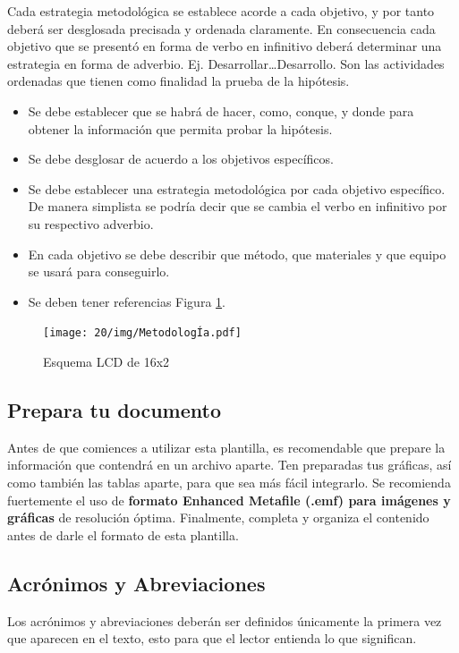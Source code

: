 Cada estrategia metodológica se establece acorde a cada objetivo, y por tanto deberá ser desglosada precisada y ordenada claramente. En consecuencia cada objetivo que se presentó en forma de verbo en infinitivo deberá determinar una estrategia en forma de adverbio. Ej. Desarrollar…Desarrollo. Son las actividades ordenadas que tienen como finalidad la prueba de la hipótesis. 

\begin{itemize}
    \item Se debe establecer que se habrá de hacer, como, conque, y donde para obtener la información que permita probar la hipótesis.  
    \item Se debe desglosar de acuerdo a los objetivos específicos. 
    \item Se debe establecer una estrategia metodológica por cada objetivo específico. De manera simplista se podría decir que se cambia el verbo en infinitivo por su respectivo adverbio.
    \item En cada objetivo se debe describir que método, que materiales y que equipo se usará para conseguirlo.
    \item Se deben tener referencias Figura \ref{fig:lcd-16x2}.
\end{itemize}
%
% 
\begin{figure}[H]
    \centering
    \texttt{[image: 20/img/MetodologÍa.pdf]}
    \caption{Esquema LCD de 16x2}
    \label{fig:lcd-16x2}
\end{figure}
% 
% 
\subsection{Prepara tu documento}

Antes de que comiences a utilizar esta plantilla, es recomendable que prepare la información que contendrá en un archivo aparte. 
Ten preparadas tus gráficas, así como también las tablas aparte, para que sea más fácil integrarlo. 
Se recomienda fuertemente el uso de \textbf{formato Enhanced Metafile (.emf) para imágenes y gráficas} de resolución óptima. 
Finalmente, completa y organiza el contenido antes de darle el formato de esta plantilla. 

\subsection{Acrónimos y Abreviaciones}

Los acrónimos y abreviaciones deberán ser definidos únicamente la primera vez que aparecen en el texto, esto para que el lector entienda lo que significan.

